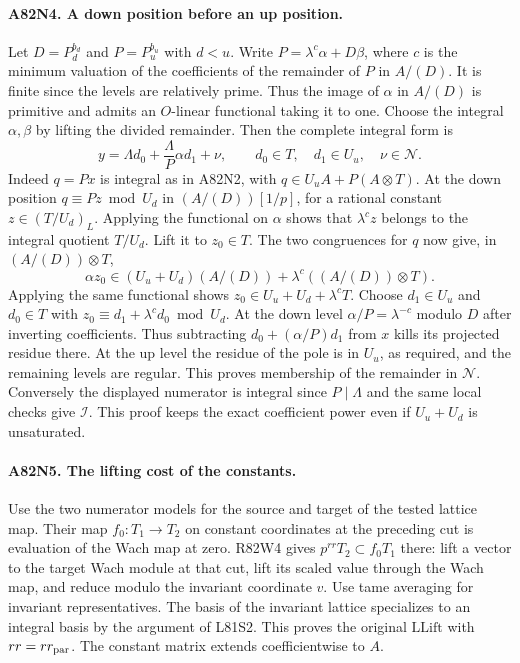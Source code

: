 \paragraph{A82N4. A down position before an up position.}
Let $D=P_d^{b_d}$ and $P=P_u^{b_u}$ with $d<u$. Write
$P=\lambda^c\alpha+D\beta$, where $c$ is the minimum valuation
of the coefficients of the remainder of $P$ in $A/(D)$.
It is finite since the levels are relatively prime. Thus the
image of $\alpha$ in $A/(D)$ is primitive and admits an
$O$-linear functional taking it to one. Choose the integral
$\alpha,\beta$ by lifting the divided remainder. Then the
complete integral form is
\[
  y=\Lambda d_0+\frac{\Lambda}{P}\alpha d_1+\nu,
  \qquad d_0\in T,\quad d_1\in U_u,\quad\nu\in\mathcal N .
\]
Indeed $q=Px$ is integral as in A82N2, with
$q\in U_u A+P(A\otimes T)$. At the down position
$q\equiv Pz\bmod U_d$ in $(A/(D))[1/p]$, for a rational
constant $z\in(T/U_d)_L$. Applying the functional on $\alpha$
shows that $\lambda^c z$ belongs to the integral quotient $T/U_d$.
Lift it to $z_0\in T$. The two congruences for $q$ now give,
in $(A/(D))\otimes T$,
\[
       \alpha z_0\in (U_u+U_d)(A/(D))
                           +\lambda^c ((A/(D))\otimes T).
\]
Applying the same functional shows
$z_0\in U_u+U_d+\lambda^c T$. Choose $d_1\in U_u$ and
$d_0\in T$ with $z_0\equiv d_1+\lambda^c d_0\bmod U_d$.
At the down level $\alpha/P=\lambda^{-c}$ modulo $D$ after
inverting coefficients. Thus subtracting
$d_0+(\alpha/P)d_1$ from $x$ kills its projected residue there.
At the up level the residue of the pole is in $U_u$, as required,
and the remaining levels are regular. This proves membership
of the remainder in $\mathcal N$. Conversely the displayed
numerator is integral since $P\mid\Lambda$ and the same local
checks give $\mathcal I$. This proof keeps the exact coefficient
power even if $U_u+U_d$ is unsaturated.

\paragraph{A82N5. The lifting cost of the constants.}
Use the two numerator models for the source and target of the
tested lattice map. Their map $f_0:T_1\to T_2$ on constant
coordinates at the preceding cut is evaluation of the Wach map
at zero. R82W4 gives $p^{rr}T_2\subset f_0T_1$ there: lift
a vector to the target Wach module at that cut, lift its scaled
value through the Wach map, and reduce modulo the invariant
coordinate $v$. Use tame averaging for invariant representatives.
The basis of the invariant lattice specializes to an integral
basis by the argument of L81S2. This proves the original
$\mathrm{LLift}$ with $rr=rr_{\rm par}$. The constant matrix
extends coefficientwise to $A$.

